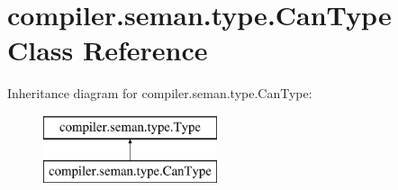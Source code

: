 \hypertarget{classcompiler_1_1seman_1_1type_1_1_can_type}{}\section{compiler.\+seman.\+type.\+Can\+Type Class Reference}
\label{classcompiler_1_1seman_1_1type_1_1_can_type}
Inheritance diagram for compiler.\+seman.\+type.\+Can\+Type\+:\begin{figure}[H]
\begin{center}
\leavevmode
\includegraphics[height=2.000000cm]{classcompiler_1_1seman_1_1type_1_1_can_type}
\end{center}
\end{figure}
